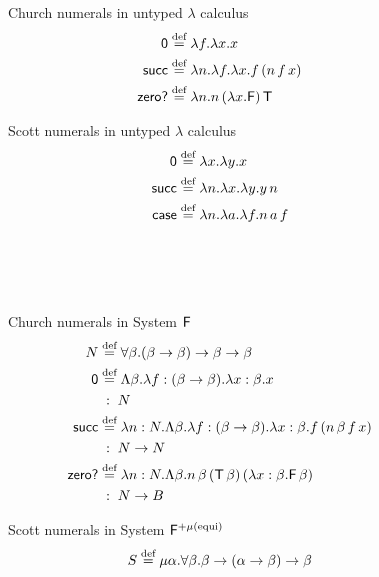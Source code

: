 \begin{figure}\small\centering
\begin{minipage}{.5\textwidth}
Church numerals in untyped $\lambda$ calculus
\begin{align*}
\textsf{0}     &\stackrel{\text{def}}{=} \lambda f.\lambda x. x \\
\textsf{succ}  &\stackrel{\text{def}}{=} \lambda n.\lambda f.\lambda x. f\,(n\,f\,x)\\
\textsf{zero?} &\stackrel{\text{def}}{=} \lambda n. n\,(\lambda x.\mathsf{F})\,\mathsf{T}
\end{align*}
\end{minipage}
\begin{minipage}{.45\textwidth}
Scott numerals in untyped $\lambda$ calculus
\begin{align*}
\mathsf{0}    &\stackrel{\text{def}}{=} \lambda x.\lambda y. x \\
\mathsf{succ} &\stackrel{\text{def}}{=} \lambda n.\lambda x.\lambda y. y\,n \\
\mathsf{case} &\stackrel{\text{def}}{=} \lambda n.\lambda a.\lambda f. n\,a\,f
\end{align*}
\end{minipage}
\\~\\~\\
\begin{minipage}{.5\textwidth}
Church numerals in System $\F^{\phantom{+\mu\text{(equi)}}}$
\begin{align*}
        N &\stackrel{\text{def}}{=} \forall\beta.(\beta\to\beta)\to\beta\to\beta\\
\textsf{0}    &\stackrel{\text{def}}{=} \Lambda\beta.
                      \lambda f:(\beta\to\beta).\lambda x:\beta.x\\
              &\;:\;N\\
\textsf{succ} &\stackrel{\text{def}}{=} \lambda n:N.
                      \Lambda\beta.
                      \lambda f:(\beta\to\beta).\lambda x:\beta.
                      f\,(n\,\beta\,f\,x)\\
              &\;:\;N\to N\\
\textsf{zero?}&\stackrel{\text{def}}{=} \lambda n:N.\Lambda\beta.n\,\beta\,(\mathsf{T}\,\beta)\,(\lambda x:\beta.\mathsf{F}\,\beta)\\
              &\;:\;N\to B
\end{align*}
\end{minipage}
\begin{minipage}{.45\textwidth}
Scott numerals in System $\mathsf{F}^{+\mu\text{(equi)}}$
\begin{align*}
        S    &\defeq \mu\alpha.\forall\beta.\beta\to(\alpha\to\beta)\to\beta\\

\end{align*}
\end{minipage}
\end{figure}
